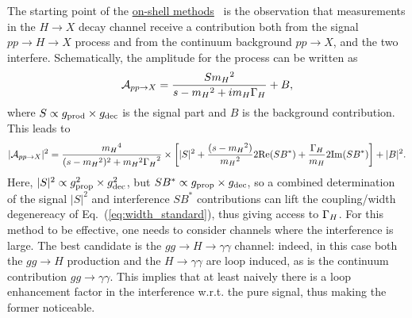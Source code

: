 The starting point of the \underline{on-shell
methods}~\cite{Dixon:2003yb,Martin:2012xc,Dixon:2013haa,Campbell:2017rke}
is the observation that measurements in the $H\to X$ decay channel
receive a contribution both from the signal $p p \to H \to X$ process
and from the continuum background $p p \to X$, and the two
interfere. Schematically, the amplitude for the process can be written
as
\begin{equation}
\mathcal A_{p p \to X} = \frac{S {m_H}^2}{s-{m_H}^2 + i {m_H}{\Gamma_H}} + B,
\end{equation}
where $S\propto g_{\rm prod}\times g_{\rm dec}$ is the signal part and $B$ is the background 
contribution. This leads to
\begin{equation}
|\mathcal A_{p p \to X}|^2 = \frac{{m_H}^4}{(s-{m_H}^2)^2 + {m_H}^2{\Gamma_H}^2}
\times\left[
|S|^2 + \frac{(s-{m_H}^2)}{{m_H}^2} 2{\rm Re}(S B^*) + \frac{{\Gamma_H}}{{m_H}} 2{\rm Im}(S B^*)
\right] + |B|^2.
\label{eq:width_gammagamma}
\end{equation}
Here, $|S|^2\propto g_{\rm prop}^2 \times g_{\rm dec}^2$, but 
$SB^*\propto g_{\rm prop}\times g_{\rm dec}$, so a combined determination of the signal $|S|^2$ and
interference $SB^*$ contributions can lift the coupling/width degenereacy of 
Eq.~(\ref{eq:width_standard}), thus giving access to ${\Gamma_H}$. 
For this method to be effective, one needs to consider channels where
the interference is large. The best candidate is the $gg\to H\to \gamma\gamma$ channel: indeed,
in this case both the $gg\to H$ production and the $H\to\gamma\gamma$ are loop induced, as is
the continuum contribution $gg\to\gamma\gamma$. This implies that at least naively there is a loop
enhancement factor in the interference w.r.t. the pure signal, thus making the former noticeable. 

